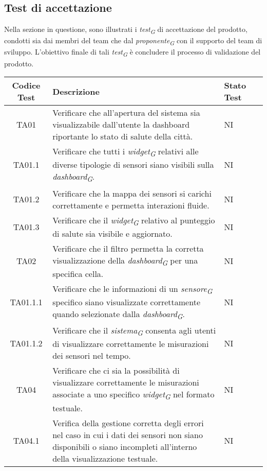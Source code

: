 \subsection{Test di accettazione}
Nella sezione in questione, sono illustrati i \textit{test}\textsubscript{\textit{G}} di accettazione del prodotto, condotti sia dai membri del team che dal \textit{proponente}\textsubscript{\textit{G}} con il supporto del team di sviluppo. L'obiettivo finale di tali \textit{test}\textsubscript{\textit{G}} è concludere il processo di validazione del prodotto.
\\
\begin{longtable}{|c|p{5cm}|p{2cm}|c|}
    \hline
    Codice Test & Descrizione & Stato Test \\
    \hline
    TA01 & Verificare che all'apertura del sistema sia visualizzabile dall'utente la dashboard riportante lo stato di salute della città. & NI \\
    \hline
    TA01.1 & Verificare che tutti i \textit{widget}\textsubscript{\textit{G}} relativi alle diverse tipologie di sensori siano visibili sulla \textit{dashboard}\textsubscript{\textit{G}}. & NI \\
    \hline
    TA01.2 & Verificare che la mappa dei sensori si carichi correttamente e permetta interazioni fluide. & NI \\
    \hline
    TA01.3 & Verificare che il \textit{widget}\textsubscript{\textit{G}} relativo al punteggio di salute sia visibile e aggiornato. & NI \\
    \hline
    TA02 & Verificare che il filtro permetta la corretta visualizzazione della \textit{dashboard}\textsubscript{\textit{G}} per una specifica cella. & NI \\
    \hline
    TA01.1.1 & Verificare che le informazioni di un \textit{sensore}\textsubscript{\textit{G}} specifico siano visualizzate correttamente quando selezionate dalla \textit{dashboard}\textsubscript{\textit{G}}. & NI \\
    \hline
    TA01.1.2 & Verificare che il \textit{sistema}\textsubscript{\textit{G}} consenta agli utenti di visualizzare correttamente le misurazioni dei sensori nel tempo. & NI \\
    \hline
    TA04 & Verificare che ci sia la possibilità di visualizzare correttamente le misurazioni associate a uno specifico \textit{widget}\textsubscript{\textit{G}} nel formato testuale.  & NI \\
    \hline
    TA04.1 & Verifica della gestione corretta degli errori nel caso in cui i dati dei sensori non siano disponibili o siano incompleti all'interno della visualizzazione testuale. & NI \\

\end{longtable}
